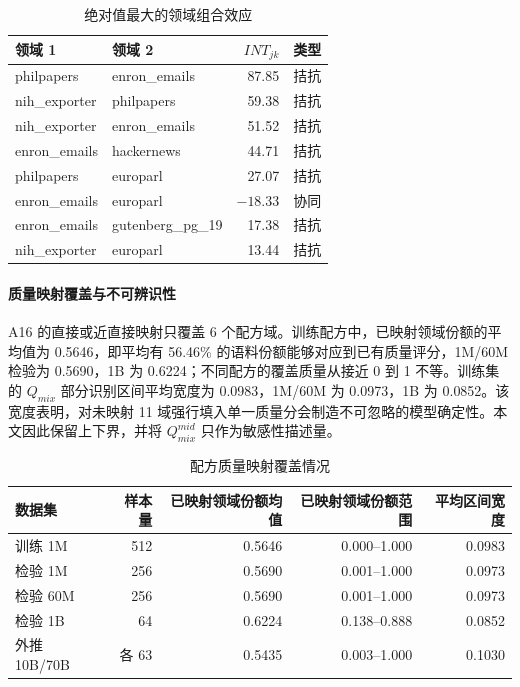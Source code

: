\documentclass[bwprint]{gmcmthesis}
\numberwithin{equation}{section}
\numberwithin{figure}{section}
\numberwithin{table}{section}
\begin{document}
        \begin{table}[H]
        \centering
        \caption{绝对值最大的领域组合效应}  %
        \label{tab:interactions}
        \begin{tabular}{llrr}
        \toprule
        领域 1 & 领域 2 & $INT_{jk}$ & 类型 \\
        \midrule
        philpapers & enron\_emails & 87.85 & 拮抗 \\
        nih\_exporter & philpapers & 59.38 & 拮抗 \\
        nih\_exporter & enron\_emails & 51.52 & 拮抗 \\
        enron\_emails & hackernews & 44.71 & 拮抗 \\
        philpapers & europarl & 27.07 & 拮抗 \\
        enron\_emails & europarl & $-18.33$ & 协同 \\
        enron\_emails & gutenberg\_pg\_19 & 17.38 & 拮抗 \\
        nih\_exporter & europarl & 13.44 & 拮抗 \\
        \bottomrule
        \end{tabular}
        \end{table}


        \paragraph{质量映射覆盖与不可辨识性}
        A16 的直接或近直接映射只覆盖 6 个配方域。训练配方中，已映射领域份额的平均值为 0.5646，即平均有 56.46\% 的语料份额能够对应到已有质量评分，1M/60M 检验为 0.5690，1B 为 0.6224；不同配方的覆盖质量从接近 0 到 1 不等。训练集的 $Q_{mix}$ 部分识别区间平均宽度为 0.0983，1M/60M 为 0.0973，1B 为 0.0852。该宽度表明，对未映射 11 域强行填入单一质量分会制造不可忽略的模型确定性。本文因此保留上下界，并将 $Q_{mix}^{mid}$ 只作为敏感性描述量。
        
        \begin{table}[H]
        \centering
        \caption{配方质量映射覆盖情况}    %
        \label{tab:mapping}
        \begin{tabular}{lrrrr}
        \toprule
        数据集 & 样本量 & 已映射领域份额均值 & 已映射领域份额范围 & 平均区间宽度 \\
        \midrule
        训练 1M & 512 & 0.5646 & 0.000--1.000 & 0.0983 \\
        检验 1M & 256 & 0.5690 & 0.001--1.000 & 0.0973 \\
        检验 60M & 256 & 0.5690 & 0.001--1.000 & 0.0973 \\
        检验 1B & 64 & 0.6224 & 0.138--0.888 & 0.0852 \\
        外推 10B/70B & 各 63 & 0.5435 & 0.003--1.000 & 0.1030 \\
        \bottomrule
        \end{tabular}
        \end{table}
\end{document}

